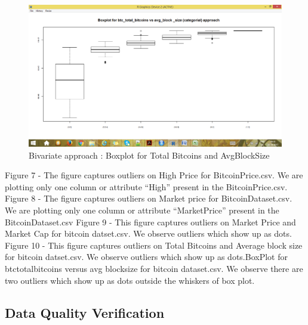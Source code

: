 \documentclass{article}
\begin{document}
\begin{figure}
    \centering
    \includegraphics[width=\linewidth]{bitcoin_dataset_btc_total_bitcoins_avg_block_size_boxplot}
    \caption{Bivariate approach : Boxplot for Total Bitcoins and AvgBlockSize}
    \label{fig:my_label}
\end{figure}
\newpage
Figure 7 - The figure captures outliers on High Price for BitcoinPrice.csv. We are plotting only one column or attribute “High” present in the BitcoinPrice.csv.
\newline Figure 8 - The figure captures outliers on Market price for BitcoinDataset.csv. We are plotting only one column or attribute “MarketPrice” present in the BitcoinDataset.csv
\newline Figure 9 - This figure captures outliers on Market Price and Market Cap for bitcoin datset.csv. We observe outliers which show up as dots.
\newline Figure 10 - This figure captures outliers on Total Bitcoins and Average block size for bitcoin datset.csv. We observe outliers which show up as dots.BoxPlot for btc\textunderscore total\textunderscore bitcoins versus avg \textunderscore block\textunderscore size for bitcoin dataset.csv. We observe there are two outliers which show up as dots outside the whiskers of box plot.

\subsection{Data Quality Verification}
\end{document}
